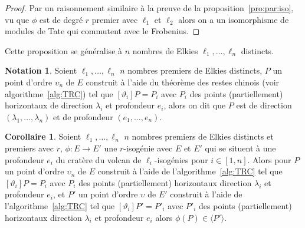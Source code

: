 \documentclass[10pt,a4paper]{book}
\theoremstyle{plain}
\theoremstyle{definition}
\theoremstyle{definition}
\newtheorem{cor}[thm]{Corollaire}
\theoremstyle{definition}
\theoremstyle{definition}
\theoremstyle{remark}
\theoremstyle{remark}
\theoremstyle{definition}
\newtheorem{nota}[thm]{Notation}
\begin{document}
\begin{proof}
Par un raisonnement similaire à la preuve de la proposition~\ref{pro:par:iso}, 
vu que $\phi$ est de degré $r$ premier avec $\ell_1$ et $\ell_2$ alors on a un 
isomorphisme de modules de Tate qui commutent avec le Frobenius.
\end{proof}

Cette proposition se généralise à $n$ nombres de Elkies $\ell_1, \dots, \ell_n$
distincts.

\begin{nota}
Soient $\ell_1, \dots, \ell_n$ $n$ nombres premiers de Elkies distincts, $P$ un
 point d'ordre $\upsilon_n$ de $E$ construit à l'aide du 
 théorème des restes chinois (voir algorithme~\ref{alg:TRC}) tel que 
$[\vartheta_i]P=P_i$ avec $P_i$ des points (partiellement) horizontaux de 
direction $\lambda_i$ et profondeur $e_i$, alors 
on dit que $P$ est de direction $(\lambda_1, \dots, \lambda_n)$ et de 
profondeur $(e_1, \dots, e_n)$. 
\end{nota}

\begin{cor}
Soient $\ell_1, \dots, \ell_n$ $n$ nombres premiers de Elkies distincts et 
premiers avec $r$, $\phi: E \rightarrow E'$ une $r$-isogénie avec $E$ et $E'$ 
qui se situent à une profondeur $e_i$ du cratère du volcan de 
$\ell_i$-isogénies pour $i \in [1,n]$. Alors pour $P$ un
 point d'ordre $\upsilon_n$ de $E$ construit à l'aide de 
l'algorithme~\ref{alg:TRC} tel que $[\vartheta_i]P=P_i$ 
avec $P_i$ des points (partiellement) horizontaux direction $\lambda_i$ et 
profondeur $e_i$, et $P'$ un point d'ordre $\upsilon$ de $E'$ construit à 
l'aide de l'algorithme~\ref{alg:TRC} tel que $[\vartheta_i]P'=P'_i$ avec $P'_i$
des points (partiellement) horizontaux direction $\lambda_i$ et profondeur 
$e_i$ alors $\phi(P) \in \langle P' \rangle$. 
\end{cor}
\end{document}
